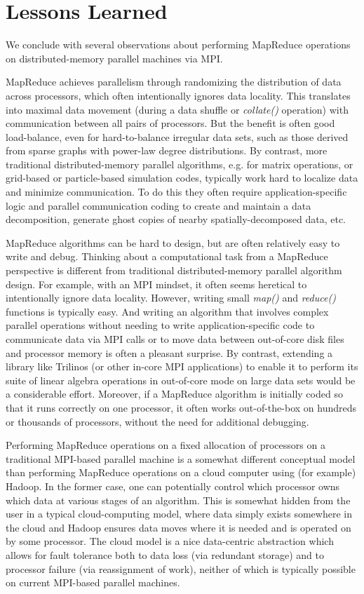 \section{Lessons Learned}
\label{sec:lessons}

We conclude with several observations about performing MapReduce
operations on distributed-memory parallel machines via MPI.

MapReduce achieves parallelism through randomizing the distribution of
data across processors, which often intentionally ignores data
locality.  This translates into maximal data movement (during a data
shuffle or {\it collate()} operation) with communication between all
pairs of processors.  But the benefit is often good load-balance, even
for hard-to-balance irregular data sets, such as those derived from
sparse graphs with power-law degree distributions.  By contrast, more
traditional distributed-memory parallel algorithms, e.g. for matrix
operations, or grid-based or particle-based simulation codes,
typically work hard to localize data and minimize communication.  To
do this they often require application-specific logic and parallel
communication coding to create and maintain a data decomposition,
generate ghost copies of nearby spatially-decomposed data, etc.

MapReduce algorithms can be hard to design, but are often relatively
easy to write and debug.  Thinking about a computational task from a
MapReduce perspective is different from traditional distributed-memory
parallel algorithm design.  For example, with an MPI mindset, it often
seems heretical to intentionally ignore data locality.  However,
writing small {\it map()} and {\it reduce()} functions is typically
easy.  And writing an algorithm that involves complex parallel
operations without needing to write application-specific code to
communicate data via MPI calls or to move data between out-of-core
disk files and processor memory is often a pleasant surprise.  By
contrast, extending a library like Trilinos (or other in-core MPI
applications) to enable it to perform its suite of linear algebra
operations in out-of-core mode on large data sets would be a
considerable effort.  Moreover, if a MapReduce algorithm is initially
coded so that it runs correctly on one processor, it often works
out-of-the-box on hundreds or thousands of processors, without the
need for additional debugging.

Performing MapReduce operations on a fixed allocation of processors on
a traditional MPI-based parallel machine is a somewhat different
conceptual model than performing MapReduce operations on a cloud
computer using (for example) Hadoop.  In the former case, one can
potentially control which processor owns which data at various stages
of an algorithm.  This is somewhat hidden from the user in a typical
cloud-computing model, where data simply exists somewhere in the cloud
and Hadoop ensures data moves where it is needed and is operated on by
some processor.  The cloud model is a nice data-centric abstraction
which allows for fault tolerance both to data loss (via redundant
storage) and to processor failure (via reassignment of work), neither
of which is typically possible on current MPI-based parallel machines.

